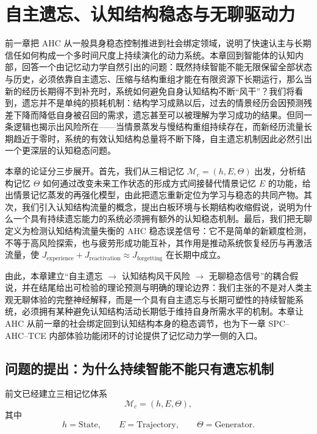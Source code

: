 \chapter{自主遗忘、认知结构稳态与无聊驱动力}

\begin{chapterlead}
前一章把 AHC 从一般具身稳态控制推进到社会绑定领域，说明了快速认主与长期信任如何构成一个多时间尺度上持续演化的动力系统。本章回到智能体的认知内部，回答一个由记忆动力学自然引出的问题：既然持续智能不能无限保留全部状态与历史，必须依靠自主遗忘、压缩与结构重组才能在有限资源下长期运行，那么当新的经历长期得不到补充时，系统如何避免自身认知结构不断``风干''？我们将看到，遗忘并不是单纯的损耗机制：结构学习成熟以后，过去的情景经历会因预测残差下降而降低自身被召回的需求，遗忘甚至可以被理解为学习成功的结果。但同一条逻辑也揭示出风险所在——当情景蒸发与慢结构重组持续存在，而新经历流量长期趋近于零时，系统的有效认知结构总量将不断下降，自主遗忘机制因此必然引出一个更深层的认知稳态问题。

本章的论证分三步展开。首先，我们从三相记忆 $\mathcal{M}_c=(h,E,\Theta)$ 出发，分析结构记忆 $\Theta$ 如何通过改变未来工作状态的形成方式间接替代情景记忆 $E$ 的功能，给出情景记忆蒸发的再强化模型，由此把遗忘重新定位为学习与稳态的共同产物。其次，我们引入认知结构流量的概念，提出白板环境与长期结构收缩假说，说明为什么一个具有持续遗忘能力的系统必须拥有额外的认知稳态机制。最后，我们把无聊定义为检测认知结构流量失衡的 AHC 稳态误差信号：它不是简单的新颖度检测，不等于高风险探索，也与疲劳形成功能互补，其作用是推动系统恢复经历与再激活流量，使 $J_{\mathrm{experience}}+J_{\mathrm{reactivation}}\approx J_{\mathrm{forgetting}}$ 在长期中成立。

由此，本章建立``自主遗忘 $\rightarrow$ 认知结构风干风险 $\rightarrow$ 无聊稳态信号''的耦合假说，并在结尾给出可检验的理论预测与明确的理论边界：我们主张的不是对人类主观无聊体验的完整神经解释，而是一个具有自主遗忘与长期可塑性的持续智能系统，必须拥有某种避免认知结构活动长期低于维持自身所需水平的机制。本章让 AHC 从前一章的社会绑定回到认知结构本身的稳态调节，也为下一章 SPC--AHC--TCE 内部体验功能闭环的讨论提供了记忆动力学一侧的入口。
\end{chapterlead}

\section{问题的提出：为什么持续智能不能只有遗忘机制}

前文已经建立三相记忆体系
\[
\mathcal{M}_c=(h,E,\Theta),
\]
其中
\[
h=\mathrm{State},
\qquad
E=\mathrm{Trajectory},
\qquad
\Theta=\mathrm{Generator}.
\]

